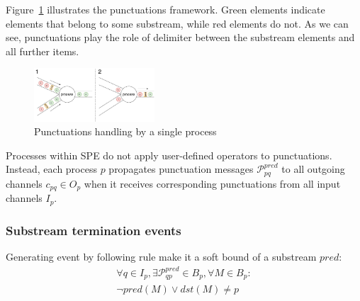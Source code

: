 Figure~\ref{punctuations_scheme} illustrates the punctuations framework. Green elements indicate elements that belong to some substream, while red elements do not. As we can see, punctuations play the role of delimiter between the substream elements and all further items.

\begin{figure}[htbp]
  \centering
  \includegraphics[width=0.40\textwidth]{pics/punctuations-scheme.pdf}
  \caption{Punctuations handling by a single process}
  \label{punctuations_scheme}
\end{figure}

Processes within SPE do not apply user-defined operators to punctuations. Instead, each process $p$ propagates punctuation messages $\mathcal{P}_{pq}^{pred}$ to all outgoing channels $c_{pq} \in O_p$  when it receives corresponding punctuations from all input channels $I_p$.

\subsubsection{Substream termination events}

\begin{lemma}
Generating event by following rule make it a soft bound of a substream $pred$:
\begin{multline}
\forall q \in I_p, \exists \mathcal{P}^{pred}_{qp} \in B_p, \forall M\in B_p : \\ \neg pred(M) \vee dst(M) \ne p
\end{multline}
\end{lemma}


